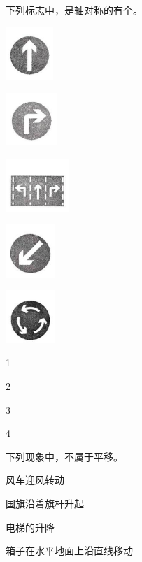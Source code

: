 \documentclass[12pt]{exam-zh}
\begin{document}
\begin{question}[index=4]
下列标志中，是轴对称的有\fillin[width=3em][]个。
\begin{multifigures}[columns=5,xshift=10mm]
    \item \includegraphics[height=2cm]{4.png}
    \item \includegraphics[height=2cm]{5.png}
    \item \includegraphics[height=2cm]{6.png}
    \item \includegraphics[height=2cm]{7.png}
    \item \includegraphics[height=2cm]{8.png}
\end{multifigures}
\begin{choices}
\item 1
\item 2
\item 3
\item 4
\end{choices}
\end{question}

\begin{question}[index=5]
下列现象中，\fillin[width=3em][]不属于平移。
\begin{choices}
\item 风车迎风转动
\item 国旗沿着旗杆升起
\item 电梯的升降
\item 箱子在水平地面上沿直线移动
\end{choices}
\end{question}
\end{document}
